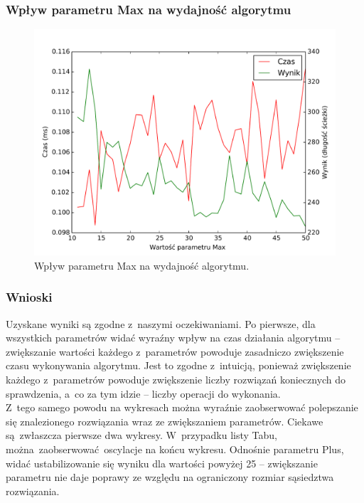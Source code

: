 \documentclass[11pt,a4paper]{article}
\begin{document}
\newpage
\subsubsection{Wpływ parametru Max na wydajność algorytmu}
\begin{figure}[H]
\includegraphics[trim = 0mm 3mm 0mm 12mm, clip, width=14cm]{graphs/max.pdf}
\caption{Wpływ parametru Max na wydajność algorytmu.}
\end{figure}

\subsubsection{Wnioski}
Uzyskane wyniki są zgodne z~naszymi oczekiwaniami. Po pierwsze, dla wszystkich parametrów widać wyraźny wpływ na czas działania algorytmu -- zwiększanie wartości każdego z~parametrów powoduje zasadniczo zwiększenie czasu wykonywania algorytmu. Jest to zgodne z~intuicją, ponieważ zwiększenie każdego z~parametrów powoduje zwiększenie liczby rozwiązań koniecznych do sprawdzenia, a~co za tym idzie -- liczby operacji do wykonania.\\

Z~tego samego powodu na wykresach można wyraźnie zaobserwować polepszanie się znalezionego rozwiązania wraz ze zwiększaniem parametrów. Ciekawe są zwłaszcza pierwsze dwa wykresy. W~przypadku listy Tabu, można zaobserwować oscylacje na końcu wykresu. Odnośnie parametru Plus, widać ustabilizowanie się wyniku dla wartości powyżej 25 -- zwiększanie parametru nie daje poprawy ze względu na ograniczony rozmiar sąsiedztwa rozwiązania. \\
\end{document}
